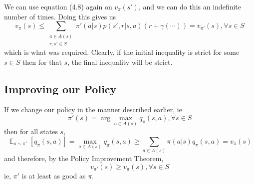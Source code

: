 \documentclass[12pt]{report}
\begin{document}
We can use equation (4.8) again on $v_{\pi}(s')$, and we can do this an indefinite number of times. Doing this gives us
\begin{equation}
    v_{\pi}(s) \leq \sum\limits_{\substack{a \in A(s)\\r, s' \in S}} \pi'(a | s) p(s', r | s, a)(r + \gamma(\cdots)) = v_{\pi'}(s), \forall s \in S
\end{equation}
which is what was required. Clearly, if the initial inequality is strict for some $s \in S$ then for that $s$, the final inequality will be strict.



\subsection{Improving our Policy}
If we change our policy in the manner described earlier, ie 
\begin{equation}
    \pi'(s) = \arg\max\limits_{a \in A(s)} q_{\pi}(s, a), \forall s \in S
\end{equation}
then for all states $s$,
\begin{equation}
    \mathop{\mathbb{E}}_{a \sim \pi'}\left[q_{\pi}(s, a)\right] = \max\limits_{a \in A(s)} q_{\pi}(s, a) \geq \sum\limits_{a \in A(s)} \pi(a | s) q_{\pi}(s, a) = v_{\pi}(s)
\end{equation}
and therefore, by the Policy Improvement Theorem,
\begin{equation}
    v_{\pi'}(s) \geq v_{\pi}(s), \forall s \in S
\end{equation}
ie, $\pi'$ is at least as good as $\pi$.
\end{document}
